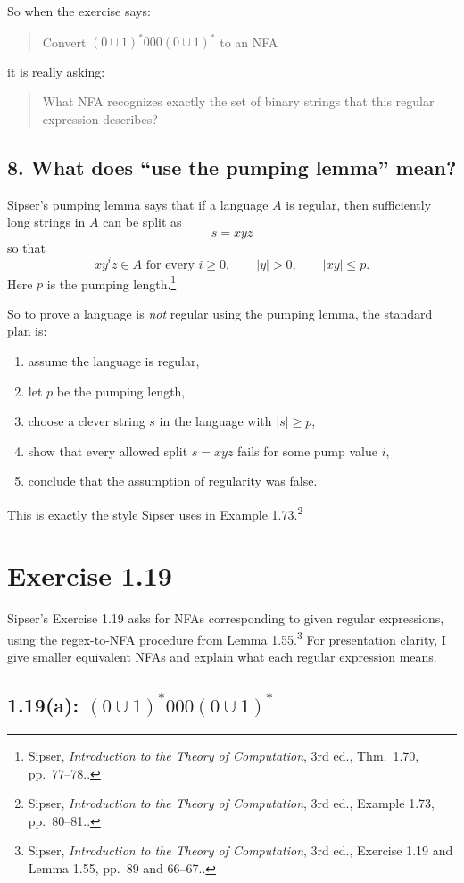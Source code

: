\documentclass[12pt]{article}
\newcommand{\sipser}[1]{\footnote{Sipser, \emph{Introduction to the Theory of Computation}, 3rd ed., #1.}}
\begin{document}
So when the exercise says:

\begin{quote}
Convert \((0\cup 1)^*000(0\cup 1)^*\) to an NFA
\end{quote}

it is really asking:

\begin{quote}
What NFA recognizes exactly the set of binary strings that this regular expression describes?
\end{quote}

\subsection*{8. What does ``use the pumping lemma'' mean?}

Sipser's pumping lemma says that if a language \(A\) is regular, then sufficiently long strings in \(A\) can be split as
\[
s=xyz
\]
so that
\[
xy^iz\in A \text{ for every } i\ge 0,\qquad |y|>0,\qquad |xy|\le p.
\]
Here \(p\) is the pumping length.\sipser{Thm.~1.70, pp.~77--78.}

So to prove a language is \emph{not} regular using the pumping lemma, the standard plan is:
\begin{enumerate}[itemsep=0.3em]
    \item assume the language is regular,
    \item let \(p\) be the pumping length,
    \item choose a clever string \(s\) in the language with \(|s|\ge p\),
    \item show that every allowed split \(s=xyz\) fails for some pump value \(i\),
    \item conclude that the assumption of regularity was false.
\end{enumerate}
This is exactly the style Sipser uses in Example 1.73.\sipser{Example 1.73, pp.~80--81.}

\newpage
\section*{Exercise 1.19}

Sipser's Exercise 1.19 asks for NFAs corresponding to given regular expressions, using the regex-to-NFA procedure from Lemma 1.55.\sipser{Exercise 1.19 and Lemma 1.55, pp.~89 and 66--67.} For presentation clarity, I give smaller equivalent NFAs and explain what each regular expression means.

\subsection*{1.19(a): \((0\cup 1)^*000(0\cup 1)^*\)}
\end{document}
